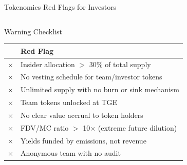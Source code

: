 \documentclass[8pt,aspectratio=169]{beamer}
\begin{document}
\begin{frame}{Tokenomics Red Flags for Investors}
\begin{columns}[T]
\begin{alertblock}{\footnotesize Warning Checklist}
\footnotesize
\renewcommand{\arraystretch}{1.15}
\begin{tabular}{cp{5.5cm}}
\toprule
& \textbf{Red Flag} \\
\midrule
\textcolor{mlred}{\Large$\boldsymbol{\times}$} & Insider allocation $>$ 30\% of total supply \\
\textcolor{mlred}{\Large$\boldsymbol{\times}$} & No vesting schedule for team/investor tokens \\
\textcolor{mlred}{\Large$\boldsymbol{\times}$} & Unlimited supply with no burn or sink mechanism \\
\textcolor{mlred}{\Large$\boldsymbol{\times}$} & Team tokens unlocked at TGE \\
\textcolor{mlred}{\Large$\boldsymbol{\times}$} & No clear value accrual to token holders \\
\textcolor{mlred}{\Large$\boldsymbol{\times}$} & FDV/MC ratio $>$ 10$\times$ (extreme future dilution) \\
\textcolor{mlred}{\Large$\boldsymbol{\times}$} & Yields funded by emissions, not revenue \\
\textcolor{mlred}{\Large$\boldsymbol{\times}$} & Anonymous team with no audit \\
\bottomrule
\end{tabular}
\end{alertblock}


\end{columns}
\end{frame}
\end{document}
